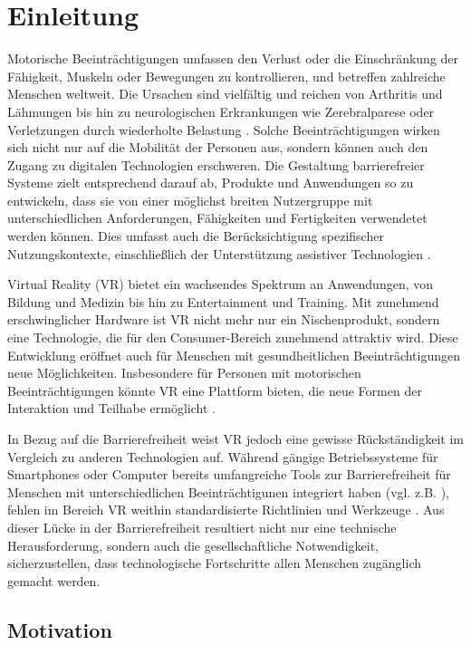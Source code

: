 \chapter{Einleitung}

Motorische Beeinträchtigungen umfassen den Verlust oder die Einschränkung der Fähigkeit, Muskeln oder Bewegungen zu kontrollieren, und betreffen zahlreiche Menschen weltweit. Die Ursachen sind vielfältig und reichen von Arthritis und Lähmungen bis hin zu neurologischen Erkrankungen wie Zerebralparese oder Verletzungen durch wiederholte Belastung \citep{yuan_game_2011}. Solche Beeinträchtigungen wirken sich nicht nur auf die Mobilität der Personen aus, sondern können auch den Zugang zu digitalen Technologien erschweren. Die Gestaltung barrierefreier Systeme zielt entsprechend darauf ab, Produkte und Anwendungen so zu entwickeln, dass sie von einer möglichst breiten Nutzergruppe mit unterschiedlichen Anforderungen, Fähigkeiten und Fertigkeiten verwendetet werden können. Dies umfasst auch die Berücksichtigung spezifischer Nutzungskontexte, einschließlich der Unterstützung assistiver Technologien \citep{DINISO9241}. 

Virtual Reality (VR) bietet ein wachsendes Spektrum an Anwendungen, von Bildung und Medizin bis hin zu Entertainment und Training. Mit zunehmend erschwinglicher Hardware ist VR nicht mehr nur ein Nischenprodukt, sondern eine Technologie, die für den Consumer-Bereich zunehmend attraktiv wird. Diese Entwicklung eröffnet auch für Menschen mit gesundheitlichen Beeinträchtigungen neue Möglichkeiten. Insbesondere für Personen mit motorischen Beeinträchtigungen könnte VR eine Plattform bieten, die neue Formen der Interaktion und Teilhabe ermöglicht \citep{mott_i_2020}.

In Bezug auf die Barrierefreiheit weist VR jedoch eine gewisse Rückständigkeit im Vergleich zu anderen Technologien auf. Während gängige Betriebssysteme für Smartphones oder Computer bereits umfangreiche Tools zur Barrierefreiheit für Menschen mit unterschiedlichen Beeinträchtigunen integriert haben (vgl. z.B. \citep{apple_einfuhrung_2024}), fehlen im Bereich VR weithin standardisierte Richtlinien und Werkzeuge \citep{ciccone_next_2023}. Aus dieser Lücke in der Barrierefreiheit resultiert nicht nur eine technische Herausforderung, sondern auch die gesellschaftliche Notwendigkeit, sicherzustellen, dass technologische Fortschritte allen Menschen zugänglich gemacht werden.

\section{Motivation}

